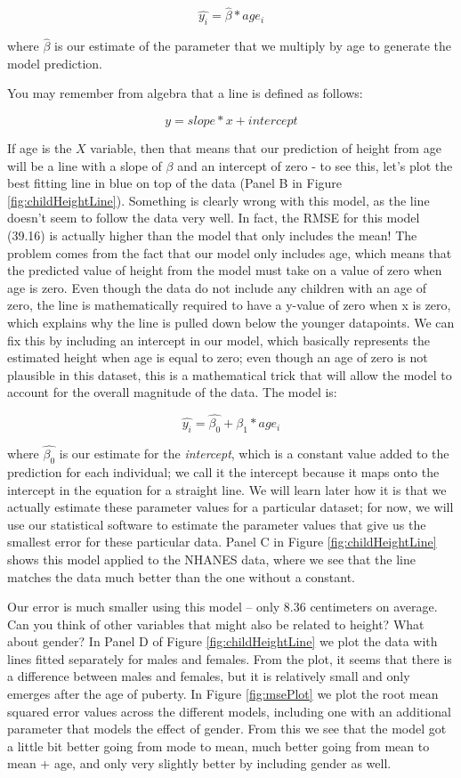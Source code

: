 \documentclass[12pt,]{book}
\theoremstyle{definition}
\theoremstyle{definition}
\theoremstyle{definition}
\theoremstyle{remark}
\begin{document}
\[
\hat{y_i} =  \hat{\beta} * age_i
\]

where \(\hat{\beta}\) is our estimate of the parameter that we multiply by age to generate the model prediction.

You may remember from algebra that a line is defined as follows:

\[
y = slope*x + intercept
\]

If age is the \(X\) variable, then that means that our prediction of height from age will be a line with a slope of \(\beta\) and an intercept of zero - to see this, let's plot the best fitting line in blue on top of the data (Panel B in Figure \ref{fig:childHeightLine}). Something is clearly wrong with this model, as the line doesn't seem to follow the data very well. In fact, the RMSE for this model (39.16) is actually higher than the model that only includes the mean! The problem comes from the fact that our model only includes age, which means that the predicted value of height from the model must take on a value of zero when age is zero. Even though the data do not include any children with an age of zero, the line is mathematically required to have a y-value of zero when x is zero, which explains why the line is pulled down below the younger datapoints. We can fix this by including an intercept in our model, which basically represents the estimated height when age is equal to zero; even though an age of zero is not plausible in this dataset, this is a mathematical trick that will allow the model to account for the overall magnitude of the data. The model is:

\[
\widehat{y_i} = \hat{\beta_0} + \hat{\beta_1} * age_i
\]

where \(\hat{\beta_0}\) is our estimate for the \emph{intercept}, which is a constant value added to the prediction for each individual; we call it the intercept because it maps onto the intercept in the equation for a straight line. We will learn later how it is that we actually estimate these parameter values for a particular dataset; for now, we will use our statistical software to estimate the parameter values that give us the smallest error for these particular data. Panel C in Figure \ref{fig:childHeightLine} shows this model applied to the NHANES data, where we see that the line matches the data much better than the one without a constant.

Our error is much smaller using this model -- only 8.36 centimeters on average. Can you think of other variables that might also be related to height? What about gender? In Panel D of Figure \ref{fig:childHeightLine} we plot the data with lines fitted separately for males and females. From the plot, it seems that there is a difference between males and females, but it is relatively small and only emerges after the age of puberty. In Figure \ref{fig:msePlot} we plot the root mean squared error values across the different models, including one with an additional parameter that models the effect of gender. From this we see that the model got a little bit better going from mode to mean, much better going from mean to mean + age, and only very slightly better by including gender as well.
\end{document}
